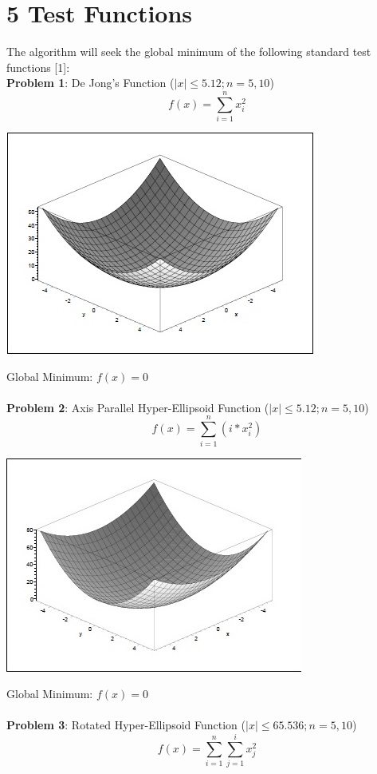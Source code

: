 \documentclass{article}
\begin{document}
\section{5 Test Functions}
The algorithm will seek the global minimum of the following standard test functions [1]:\\
\textbf{Problem 1}: De Jong's Function ($|x| \leq 5.12; n=5,10$)
\begin{equation}
f(x) = \sum^n_{i=1}x_i^2
\end{equation}
\centerline{\includegraphics{tf1}}
Global Minimum: $f(x) = 0$\\\\
\textbf{Problem 2}: Axis Parallel Hyper-Ellipsoid Function ($|x| \leq 5.12; n=5,10$)
\begin{equation}
f(x) = \sum^n_{i=1}(i*x_i^2)
\end{equation}
\centerline{\includegraphics{tf2}}
Global Minimum: $f(x) = 0$\\\\
\textbf{Problem 3}: Rotated Hyper-Ellipsoid Function ($|x| \leq 65.536; n=5,10$)
\begin{equation}
f(x) = \sum^n_{i=1}\sum^i_{j=1}x_j^2
\end{equation}
\end{document}
